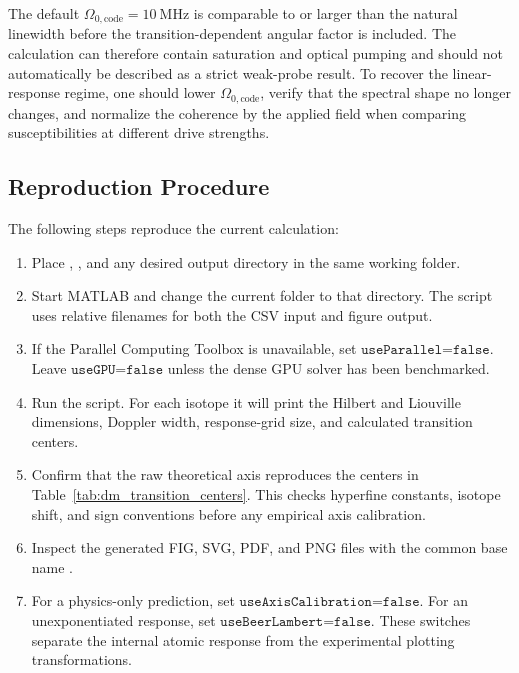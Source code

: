 The default \(\Omega_{0,\mathrm{code}}=10~\mathrm{MHz}\) is comparable to or
larger than the natural linewidth before the transition-dependent angular
factor is included.  The calculation can therefore contain saturation and
optical pumping and should not automatically be described as a strict
weak-probe result.  To recover the linear-response regime, one should lower
\(\Omega_{0,\mathrm{code}}\), verify that the spectral shape no longer changes,
and normalize the coherence by the applied field when comparing
susceptibilities at different drive strengths.

\subsection{Reproduction Procedure}
\label{subsec:dm_reproduction}

The following steps reproduce the current calculation:

\begin{enumerate}[label=\arabic*.]
\item Place
,
, and any desired output directory in the same working
folder.

\item Start MATLAB and change the current folder to that directory.  The
script uses relative filenames for both the CSV input and figure output.

\item If the Parallel Computing Toolbox is unavailable, set
\(\texttt{useParallel=false}\).  Leave \(\texttt{useGPU=false}\) unless the
dense GPU solver has been benchmarked.

\item Run the script.  For each isotope it will print the Hilbert and
Liouville dimensions, Doppler width, response-grid size, and calculated
transition centers.

\item Confirm that the raw theoretical axis reproduces the centers in
Table~\ref{tab:dm_transition_centers}.  This checks hyperfine constants,
isotope shift, and sign conventions before any empirical axis calibration.

\item Inspect the generated FIG, SVG, PDF, and PNG files with the common base
name .

\item For a physics-only prediction, set
\(\texttt{useAxisCalibration=false}\).  For an unexponentiated response, set
\(\texttt{useBeerLambert=false}\).  These switches separate the internal
atomic response from the experimental plotting transformations.
\end{enumerate}

